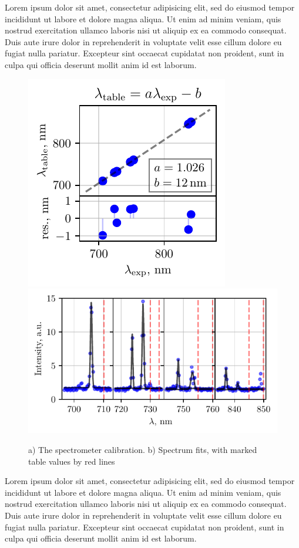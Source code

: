 Lorem ipsum dolor sit amet, consectetur adipisicing elit, sed do eiusmod
tempor incididunt ut labore et dolore magna aliqua. Ut enim ad minim veniam,
quis nostrud exercitation ullamco laboris nisi ut aliquip ex ea commodo
consequat. Duis aute irure dolor in reprehenderit in voluptate velit esse
cillum dolore eu fugiat nulla pariatur. Excepteur sint occaecat cupidatat non
proident, sunt in culpa qui officia deserunt mollit anim id est laborum.

\begin{figure}[h]
    \centering
    \includegraphics{../labs/2/calibration_linear_fit.pdf}
    \hspace{5 mm} 
    \includegraphics{../labs/2/calibration_gaussian_fits.pdf}
    \caption{a) The spectrometer calibration. b) Spectrum fits, with marked table values by red lines}
\end{figure}


Lorem ipsum dolor sit amet, consectetur adipisicing elit, sed do eiusmod
tempor incididunt ut labore et dolore magna aliqua. Ut enim ad minim veniam,
quis nostrud exercitation ullamco laboris nisi ut aliquip ex ea commodo
consequat. Duis aute irure dolor in reprehenderit in voluptate velit esse
cillum dolore eu fugiat nulla pariatur. Excepteur sint occaecat cupidatat non
proident, sunt in culpa qui officia deserunt mollit anim id est laborum.